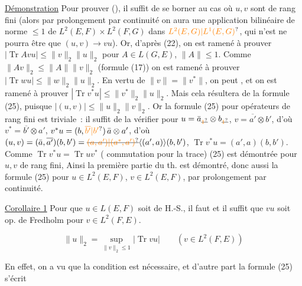 \uline{Démonstration} Pour prouver (), il suffit 
 de se borner au cas où $u,v$ sont de rang fini
(alors  par prolongement par continuité on aura
une application bilinéaire de norme $\leq1$ de $L^2(E,F)\times
L^2(F,G)$ dans $\unsure{L^2(E,G)|L^1(E,G)}$, qui n'est   ne pourra
être que $(u,v)\to vu$). Or,  d'après (22),
on est ramené  à prouver $|\operatorname{Tr} Avu|\leq\|v\|_2\|u\|_2$
pour \unsure{$\forall$} $A\in L(G,E)$, $\|A\|\leq1$. Comme $\|Av\|_2\leq\|A\|\|v\|_2$
 (formule (17)) on est ramené à prouver
$|\operatorname{Tr}wu|\leq\|w\|_2\|u\|_2$. En vertu de $\|v\|=\|v^*\|$, on
peut  , et on est ramené
à prouver $|\operatorname{Tr}v^*u|\leq\|v^*\|_2\|u\|_2$. Mais cela résultera
de la formule (25), puisque $|(u,v)|\leq\|u\|_2\|v\|_2$.
 Or la formule (25) pour opérateurs de rang
fini est triviale \,: il suffit de la vérifier pour
$u=\bar a_{\deleted{\unsure{1}}}\otimes b_{\deleted{\unsure{1}}}$, $v=\overline{a'}\otimes b'$, d'où $v^*=\overline{b'}\otimes a'$,
$v^*u=(b,\unsure{\overline{b'}|b'})\,\bar a\otimes a'$,  d'où
 $(u,v)=(\bar a,\overline{a'})(b,b')=\deleted{\unsure{(a,a')|(a^*,a')}}\inserted{(a',a)}(b,b')$, $\operatorname{Tr}v^*u=(a',a)(b,b')$.
Comme $\operatorname{Tr}v^*u=\operatorname{Tr}uv^*$ ( commutation pour la trace)
(25) est démontrée pour $u,v$ de rang fini,  Ainsi
la première partie du th. est démontré, donc aussi
la formule (25) pour  $u\in L^2(E,F)$, $v\in L^2(E,F)$, par
prolongement par continuité.

\uline{Corollaire 1} Pour que $u\in L(E,F)$ soit  de H.-S., il faut et il
suffit que  $vu$ soit op. de Fredholm pour  $v\in L^2(F,E)$.
 

\[
\|u\|_2=\sup_{\|v\|_2\leq1}|\operatorname{Tr}vu|\qquad(v\in L^2(F,E)) \tag*{(26)}
\]

En effet, on a vu que la condition est nécessaire, et
d'autre part la formule (25) s'écrit

